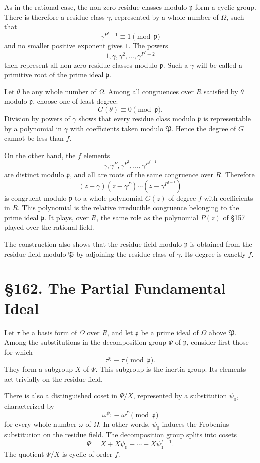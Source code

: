 \documentclass[11pt,a4paper]{book}
\newcommand{\webersection}[2]{\clearpage\section*{\S #1. #2}}
\newcommand{\Pgr}{\mathfrak P}
\newcommand{\p}{\mathfrak p}
\begin{document}
As in the rational case, the non-zero residue classes modulo \(\p\) form a cyclic group.  There is therefore a residue class \(\gamma\), represented by a whole number of \(\Omega\), such that
\[
  \gamma^{P^f-1}\equiv1\pmod{\p}
\]
and no smaller positive exponent gives \(1\).  The powers
\[
  1,\gamma,\gamma^2,\ldots,\gamma^{P^f-2}
\]
then represent all non-zero residue classes modulo \(\p\).  Such a \(\gamma\) will be called a primitive root of the prime ideal \(\p\).

Let \(\theta\) be any whole number of \(\Omega\).  Among all congruences over \(R\) satisfied by \(\theta\) modulo \(\p\), choose one of least degree:
\[
  G(\theta)\equiv0\pmod{\p}.
\tag{2}
\]
Division by powers of \(\gamma\) shows that every residue class modulo \(\p\) is representable by a polynomial in \(\gamma\) with coefficients taken modulo \(\Pgr\).  Hence the degree of \(G\) cannot be less than \(f\).

On the other hand, the \(f\) elements
\[
  \gamma,\gamma^P,\gamma^{P^2},\ldots,\gamma^{P^{f-1}}
\]
are distinct modulo \(\p\), and all are roots of the same congruence over \(R\).  Therefore
\[
  (z-\gamma)(z-\gamma^P)\cdots(z-\gamma^{P^{f-1}})
\tag{3}
\]
is congruent modulo \(\p\) to a whole polynomial \(G(z)\) of degree \(f\) with coefficients in \(R\).  This polynomial is the relative irreducible congruence belonging to the prime ideal \(\p\).  It plays, over \(R\), the same role as the polynomial \(P(z)\) of \S157 played over the rational field.

The construction also shows that the residue field modulo \(\p\) is obtained from the residue field modulo \(\Pgr\) by adjoining the residue class of \(\gamma\).  Its degree is exactly \(f\).

\webersection{162}{The Partial Fundamental Ideal}

Let \(\tau\) be a basis form of \(\Omega\) over \(R\), and let \(\p\) be a prime ideal of \(\Omega\) above \(\Pgr\).  Among the substitutions in the decomposition group \(\Psi\) of \(\p\), consider first those for which
\[
  \tau^\chi\equiv \tau\pmod{\p}.
\tag{1}
\]
They form a subgroup \(X\) of \(\Psi\).  This subgroup is the inertia group.  Its elements act trivially on the residue field.

There is also a distinguished coset in \(\Psi/X\), represented by a substitution \(\psi_0\), characterized by
\[
  \omega^{\psi_0}\equiv \omega^P\pmod{\p}
\tag{2}
\]
for every whole number \(\omega\) of \(\Omega\).  In other words, \(\psi_0\) induces the Frobenius substitution on the residue field.  The decomposition group splits into cosets
\[
  \Psi=X+X\psi_0+\cdots+X\psi_0^{f-1}.
\tag{3}
\]
The quotient \(\Psi/X\) is cyclic of order \(f\).
\end{document}
